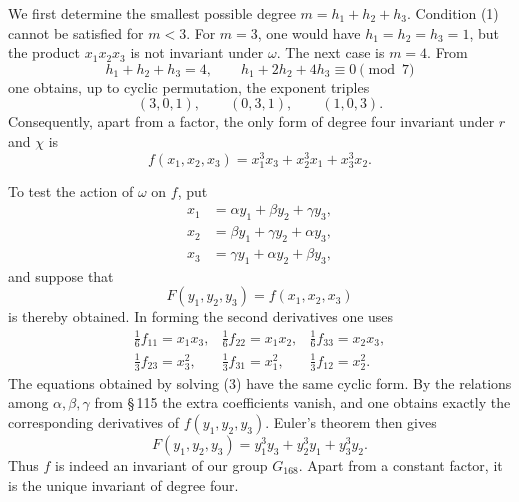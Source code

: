 \documentclass[11pt]{article}
\begin{document}
We first determine the smallest possible degree \(m=h_1+h_2+h_3\). Condition (1) cannot be satisfied for \(m<3\). For \(m=3\), one would have \(h_1=h_2=h_3=1\), but the product \(x_1x_2x_3\) is not invariant under \(\omega\). The next case is \(m=4\). From
\begin{equation}
h_1+h_2+h_3=4,
\qquad
h_1+2h_2+4h_3\equiv0\pmod 7
\end{equation}
one obtains, up to cyclic permutation, the exponent triples
\begin{equation}
(3,0,1),
\qquad (0,3,1),
\qquad (1,0,3).
\end{equation}
Consequently, apart from a factor, the only form of degree four invariant under \(r\) and \(\chi\) is
\begin{equation}
f(x_1,x_2,x_3)=x_1^3x_3+x_2^3x_1+x_3^3x_2.
\tag{2}
\end{equation}

To test the action of \(\omega\) on \(f\), put
\begin{equation}
\begin{aligned}
x_1&=\alpha y_1+\beta y_2+\gamma y_3,\\
x_2&=\beta y_1+\gamma y_2+\alpha y_3,\\
x_3&=\gamma y_1+\alpha y_2+\beta y_3,
\end{aligned}
\tag{3}
\end{equation}
and suppose that
\begin{equation}
F(y_1,y_2,y_3)=f(x_1,x_2,x_3)
\tag{4}
\end{equation}
is thereby obtained. In forming the second derivatives one uses
\begin{equation}
\begin{array}{lll}
\frac16 f_{11}=x_1x_3,&\frac16 f_{22}=x_1x_2,&\frac16 f_{33}=x_2x_3,\\[2mm]
\frac13 f_{23}=x_3^2,&\frac13 f_{31}=x_1^2,&\frac13 f_{12}=x_2^2.
\end{array}
\end{equation}
The equations obtained by solving (3) have the same cyclic form. By the relations among \(\alpha,\beta,\gamma\) from \S\,115 the extra coefficients vanish, and one obtains exactly the corresponding derivatives of \(f(y_1,y_2,y_3)\). Euler's theorem then gives
\begin{equation}
F(y_1,y_2,y_3)=y_1^3y_3+y_2^3y_1+y_3^3y_2.
\end{equation}
Thus \(f\) is indeed an invariant of our group \(G_{168}\). Apart from a constant factor, it is the unique invariant of degree four.
\end{document}
